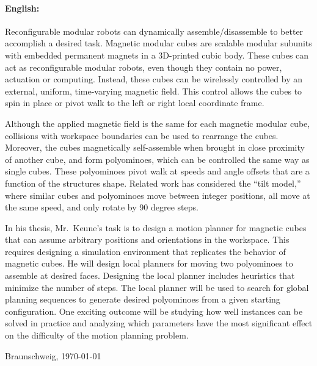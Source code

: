 \documentclass[11pt,a4paper,twoside,titlepage]{scrbook}
\theoremstyle{definition}
\begin{document}
\newpage

\paragraph{English:}
Reconfigurable modular robots can dynamically assemble/disassemble to better accomplish a desired task.
Magnetic modular cubes are scalable modular subunits with embedded permanent magnets in a 3D-printed cubic body.
These cubes can act as reconfigurable modular robots, even though they contain no power, actuation or computing.
Instead, these cubes can be wirelessly controlled by an external, uniform, time-varying magnetic field.
This control allows the cubes to spin in place or pivot walk to the left or right local coordinate frame.
 
Although the applied magnetic field is the same for each magnetic modular cube, collisions with workspace boundaries can be used to rearrange the cubes.
Moreover, the cubes magnetically self-assemble when brought in close proximity of another cube, and form polyominoes, which can be controlled the same way as single cubes. 
These polyominoes pivot walk at speeds and angle offsets that are a function of the structures shape. 
Related work has considered the ``tilt model,'' where similar cubes and polyominoes move between integer positions, all move at the same speed, and only rotate by 90 degree steps.

In his thesis, Mr.\ Keune's task is to design a motion planner for magnetic cubes that can assume arbitrary positions and orientations in the workspace.
This requires designing a simulation environment that replicates the behavior of magnetic cubes.
He will design local planners for moving two polyominoes to assemble at desired faces.
Designing the local planner includes heuristics that minimize the number of steps.
The local planner will be used to search for global planning sequences to generate desired polyominoes from a given starting configuration.
One exciting outcome will be studying how well instances can be solved in practice and analyzing which parameters have the most significant effect on the difficulty of the motion planning problem. 

\par
\vspace{1cm}
\bigskip\noindent Braunschweig, \today \par
\vspace*{10mm}
\hfill\hrulefill


	
	
	\tableofcontents
	
	\listoffigures
	
	
	
	\mainmatter
	
	
	
	
	
	
	
	
	
	
	
\end{document}
